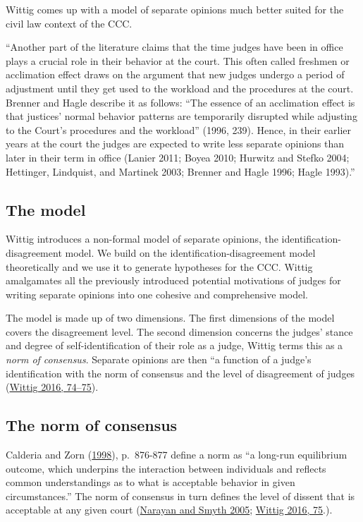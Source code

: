 \documentclass[
  11pt,
]{article}
\begin{document}
Wittig comes up with a model of separate opinions much better suited for
the civil law context of the CCC.

``Another part of the literature claims that the time judges have been
in office plays a crucial role in their behavior at the court. This
often called freshmen or acclimation effect draws on the argument that
new judges undergo a period of adjustment until they get used to the
workload and the procedures at the court. Brenner and Hagle describe it
as follows: ``The essence of an acclimation effect is that justices'
normal behavior patterns are temporarily disrupted while adjusting to
the Court's procedures and the workload'' (1996, 239). Hence, in their
earlier years at the court the judges are expected to write less
separate opinions than later in their term in office (Lanier 2011; Boyea
2010; Hurwitz and Stefko 2004; Hettinger, Lindquist, and Martinek 2003;
Brenner and Hagle 1996; Hagle 1993).''

\hypertarget{the-model}{%
\subsection{The model}\label{the-model}}

Wittig introduces a non-formal model of separate opinions, the
identification-disagreement model. We build on the
identification-disagreement model theoretically and we use it to
generate hypotheses for the CCC. Wittig amalgamates all the previously
introduced potential motivations of judges for writing separate opinions
into one cohesive and comprehensive model.

The model is made up of two dimensions. The first dimensions of the
model covers the disagreement level. The second dimension concerns the
judges' stance and degree of self-identification of their role as a
judge, Wittig terms this as a \emph{norm of consensus}. Separate
opinions are then ``a function of a judge's identification with the norm
of consensus and the level of disagreement of judges
(\protect\hyperlink{ref-wittigOccurrenceSeparateOpinions2016}{Wittig
2016, 74--75}).

\hypertarget{the-norm-of-consensus}{%
\subsection{The norm of consensus}\label{the-norm-of-consensus}}

Calderia and Zorn
(\protect\hyperlink{ref-calderiaTimeConsensualNorms1998}{1998}),
p.~876-877 define a norm as ``a long-run equilibrium outcome, which
underpins the interaction between individuals and reflects common
understandings as to what is acceptable behavior in given
circumstances.'' The norm of consensus in turn defines the level of
dissent that is acceptable at any given court
(\protect\hyperlink{ref-narayanConsensualNormHigh2005}{Narayan and Smyth
2005};
\protect\hyperlink{ref-wittigOccurrenceSeparateOpinions2016}{Wittig
2016, 75}.).
\end{document}
